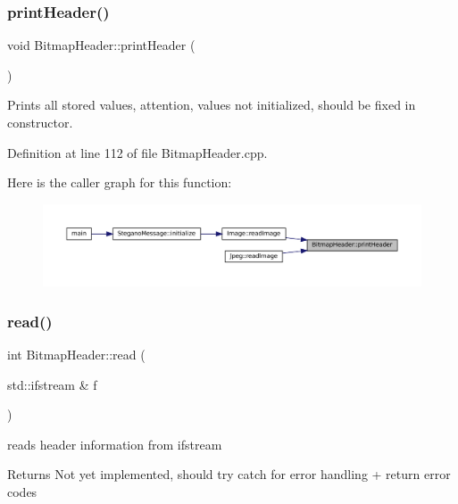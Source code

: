 \subsubsection{\texorpdfstring{printHeader()}{printHeader()}}
{\footnotesize\ttfamily void Bitmap\+Header\+::print\+Header (\begin{DoxyParamCaption}{ }\end{DoxyParamCaption})}



Prints all stored values, attention, values not initialized, should be fixed in constructor. 



Definition at line 112 of file Bitmap\+Header.\+cpp.

Here is the caller graph for this function\+:\nopagebreak
\begin{figure}[H]
\begin{center}
\leavevmode
\includegraphics[width=350pt]{classBitmapHeader_a72e26bdf3269d382dfbdc76119c1a6aa_icgraph}
\end{center}
\end{figure}
\mbox{\label{classBitmapHeader_aebc19bf8a908f1f7edfc5b10186c9db8}} 
\subsubsection{\texorpdfstring{read()}{read()}}
{\footnotesize\ttfamily int Bitmap\+Header\+::read (\begin{DoxyParamCaption}\item[{std\+::ifstream \&}]{f }\end{DoxyParamCaption})\hspace{0.3cm}{\ttfamily [private]}}



reads header information from ifstream 

\begin{DoxyReturn}{Returns}
Not yet implemented, should try catch for error handling + return error codes 
\end{DoxyReturn}


